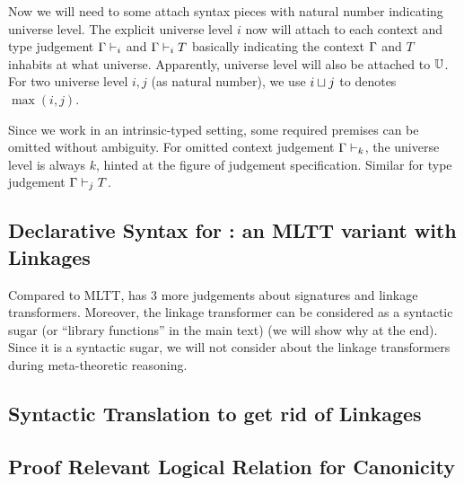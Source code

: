 Now we will need to some attach syntax pieces with natural number indicating universe level. The explicit universe level $i$ now will attach to each context and type judgement $\goodCtx{\Gm}{i}$ and $\goodType{\Gm}{T}{i}$ basically indicating the context $\Gm$ and $T$ inhabits at what universe. Apparently, universe level will also be attached to $\cU$. For two universe level $i,j$ (as natural number), we use $i \lcup j$ to denotes $\max(i,j)$.

Since we work in an intrinsic-typed setting, some required premises can be omitted without ambiguity. For omitted context judgement $\goodCtx{\Gm}{k}$, the universe level is always $k$, hinted at the figure of judgement specification. Similar for type judgement $\goodType{\Gm}{T}{j}$.



\subsection{Declarative Syntax for \TT : an MLTT variant with Linkages}
Compared to MLTT, \TT has 3 more judgements about signatures and linkage transformers. Moreover, the linkage transformer can be considered as a syntactic sugar (or ``library functions'' in the main text) (we will show why at the end). 
Since it is a syntactic sugar, we will not consider about the linkage transformers during meta-theoretic reasoning.









\subsection{Syntactic Translation to get rid of Linkages}




% 


\subsection{Proof Relevant Logical Relation for Canonicity}


